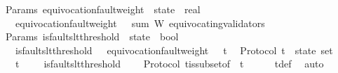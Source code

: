 \begin{isabellebody}
\endisatagproof
{\isafoldproof}%
%
\isadelimproof
\isanewline
%
\endisadelimproof
\isanewline
\isanewline
\isanewline
{}\isamarkupfalse%
\ {\isacharparenleft}\ Params{\isacharparenright}\ equivocation{\isacharunderscore}fault{\isacharunderscore}weight\ {\isacharcolon}{\isacharcolon}\ {\isachardoublequoteopen}state\ {\isasymRightarrow}\ real{\isachardoublequoteclose}\isanewline
\ \ \isanewline
\ \ \ \ {\isachardoublequoteopen}equivocation{\isacharunderscore}fault{\isacharunderscore}weight\ {\isasymsigma}\ {\isacharequal}\ sum\ W\ {\isacharparenleft}equivocating{\isacharunderscore}validators\ {\isasymsigma}{\isacharparenright}{\isachardoublequoteclose}\isanewline
\isanewline
\isanewline
{}\isamarkupfalse%
\ {\isacharparenleft}\ Params{\isacharparenright}\ is{\isacharunderscore}faults{\isacharunderscore}lt{\isacharunderscore}threshold\ {\isacharcolon}{\isacharcolon}\ {\isachardoublequoteopen}state\ {\isasymRightarrow}\ bool{\isachardoublequoteclose}\isanewline
\ \ \ \isanewline
\ \ \ \ {\isachardoublequoteopen}is{\isacharunderscore}faults{\isacharunderscore}lt{\isacharunderscore}threshold\ {\isasymsigma}\ {\isacharequal}\ {\isacharparenleft}equivocation{\isacharunderscore}fault{\isacharunderscore}weight\ {\isasymsigma}\ {\isacharless}\ t{\isacharparenright}{\isachardoublequoteclose}\isanewline
\isanewline
{}\isamarkupfalse%
\ {\isacharparenleft}\ Protocol{\isacharparenright}\ {\isasymSigma}t\ {\isacharcolon}{\isacharcolon}\ {\isachardoublequoteopen}state\ set{\isachardoublequoteclose}\isanewline
\ \ \isanewline
\ \ \ \ {\isachardoublequoteopen}{\isasymSigma}t\ {\isacharequal}\ {\isacharbraceleft}{\isasymsigma}\ {\isasymin}\ {\isasymSigma}{\isachardot}\ is{\isacharunderscore}faults{\isacharunderscore}lt{\isacharunderscore}threshold\ {\isasymsigma}{\isacharbraceright}{\isachardoublequoteclose}\ \isanewline
\isanewline
{}\isamarkupfalse%
\ {\isacharparenleft}\ Protocol{\isacharparenright}\ {\isasymSigma}t{\isacharunderscore}is{\isacharunderscore}subset{\isacharunderscore}of{\isacharunderscore}{\isasymSigma}\ {\isacharcolon}\ {\isachardoublequoteopen}{\isasymSigma}t\ {\isasymsubseteq}\ {\isasymSigma}{\isachardoublequoteclose}\isanewline
%
\isadelimproof
\ \ %
\endisadelimproof
%
\isatagproof
{}\isamarkupfalse%
\ {\isasymSigma}t{\isacharunderscore}def\ \isamarkupfalse%
\ auto%
\endisatagproof
{\isafoldproof}%
%
\isadelimproof
\isanewline
%
\endisadelimproof

\end{isabellebody}
